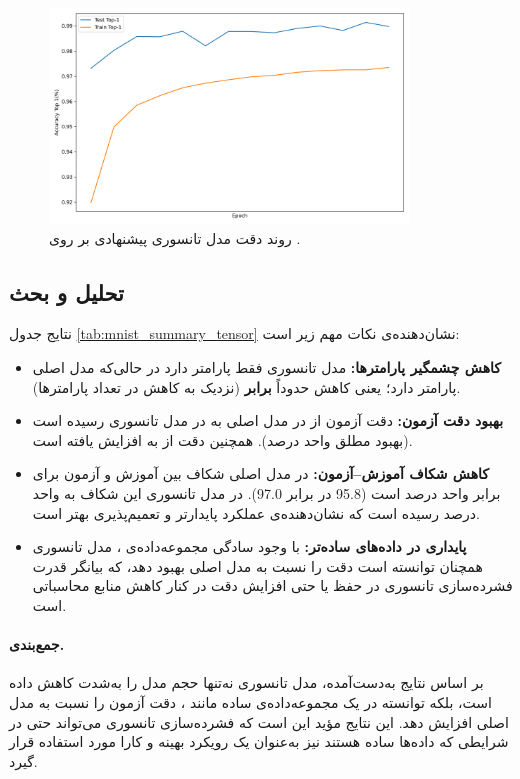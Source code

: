 \begin{figure}[ht]
	\centering
	\includegraphics[width=0.85\textwidth]{transformer_images/results/mnist_tensorized.png}
	\caption{روند دقت  مدل تانسوری پیشنهادی بر روی .}
	\label{fig:mnist_tensorized}
\end{figure}

\subsection{تحلیل و بحث}

نتایج جدول \ref{tab:mnist_summary_tensor} نشان‌دهنده‌ی نکات مهم زیر است:
\begin{itemize}
	\item \textbf{کاهش چشمگیر پارامترها:} مدل تانسوری فقط  پارامتر دارد در حالی‌که مدل اصلی  پارامتر دارد؛ یعنی کاهش حدوداً \textbf{ برابر} (نزدیک به \textbf{} کاهش در تعداد پارامترها).
	\item \textbf{بهبود دقت آزمون:} دقت  آزمون از \textbf{} در مدل اصلی به \textbf{} در مدل تانسوری رسیده است (بهبود مطلق \textbf{} واحد درصد). همچنین دقت  از \textbf{} به \textbf{} افزایش یافته است.
	\item \textbf{کاهش شکاف آموزش–آزمون:} در مدل اصلی شکاف بین آموزش و آزمون برای  برابر \textbf{} واحد درصد است (95.8 در برابر 97.0). در مدل تانسوری این شکاف به \textbf{} واحد درصد رسیده است که نشان‌دهنده‌ی عملکرد پایدارتر و تعمیم‌پذیری بهتر است.
	\item \textbf{پایداری در داده‌های ساده‌تر:} با وجود سادگی مجموعه‌داده‌ی ، مدل تانسوری همچنان توانسته است دقت را نسبت به مدل اصلی بهبود دهد، که بیانگر قدرت فشرده‌سازی تانسوری در حفظ یا حتی افزایش دقت در کنار کاهش منابع محاسباتی است.
\end{itemize}

\paragraph{جمع‌بندی.} بر اساس نتایج به‌دست‌آمده، مدل تانسوری نه‌تنها حجم مدل را به‌شدت کاهش داده است، بلکه توانسته در یک مجموعه‌داده‌ی ساده مانند ، دقت آزمون را نسبت به مدل اصلی افزایش دهد. این نتایج مؤید این است که فشرده‌سازی تانسوری می‌تواند حتی در شرایطی که داده‌ها ساده هستند نیز به‌عنوان یک رویکرد بهینه و کارا مورد استفاده قرار گیرد.








